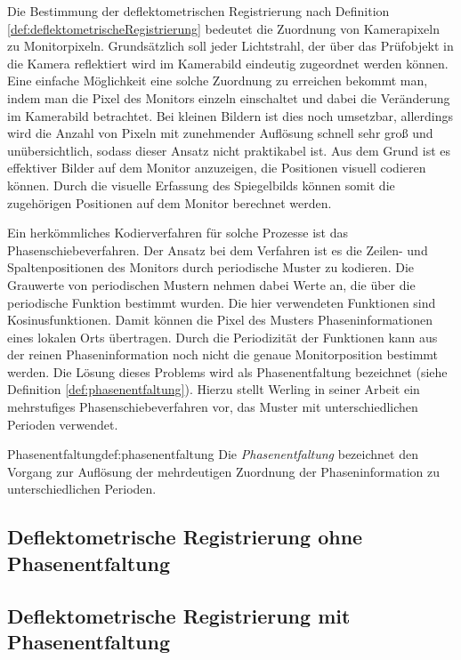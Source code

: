 Die Bestimmung der deflektometrischen Registrierung nach Definition \ref{def:deflektometrischeRegistrierung} bedeutet die Zuordnung von Kamerapixeln zu Monitorpixeln.
Grundsätzlich soll jeder Lichtstrahl, der über das Prüfobjekt in die Kamera reflektiert wird im Kamerabild eindeutig zugeordnet werden können.
Eine einfache Möglichkeit eine solche Zuordnung zu erreichen bekommt man, indem man die Pixel des Monitors einzeln einschaltet und dabei die Veränderung im Kamerabild betrachtet.
Bei kleinen Bildern ist dies noch umsetzbar, allerdings wird die Anzahl von Pixeln mit zunehmender Auflösung schnell sehr groß und unübersichtlich, sodass dieser Ansatz nicht praktikabel ist.
Aus dem Grund ist es effektiver Bilder auf dem Monitor anzuzeigen, die Positionen visuell codieren können.
Durch die visuelle Erfassung des Spiegelbilds können somit die zugehörigen Positionen auf dem Monitor berechnet werden.

\p
Ein herkömmliches Kodierverfahren für solche Prozesse ist das Phasenschiebeverfahren.
Der Ansatz bei dem Verfahren ist es die Zeilen- und Spaltenpositionen des Monitors durch periodische Muster zu kodieren.
Die Grauwerte von periodischen Mustern nehmen dabei Werte an, die über die periodische Funktion bestimmt wurden.
Die hier verwendeten Funktionen sind Kosinusfunktionen.
Damit können die Pixel des Musters Phaseninformationen eines lokalen Orts übertragen.
Durch die Periodizität der Funktionen kann aus der reinen Phaseninformation noch nicht die genaue Monitorposition bestimmt werden.
Die Lösung dieses Problems wird als Phasenentfaltung bezeichnet (siehe Definition \ref{def:phasenentfaltung}).
Hierzu stellt Werling in seiner Arbeit \cite{kit_werling} ein mehrstufiges Phasenschiebeverfahren vor, das Muster mit unterschiedlichen Perioden verwendet.

\begin{Definition}{Phasenentfaltung}{def:phasenentfaltung}
	Die \textit{Phasenentfaltung} bezeichnet den Vorgang zur Auflösung der mehrdeutigen Zuordnung der Phaseninformation zu unterschiedlichen Perioden.
\end{Definition}

{
	\FloatBarrier
    \subsection{Deflektometrische Registrierung ohne Phasenentfaltung}
    \label{sub:registrierungOhnePhasenentfaltung}
    
}

{
	\FloatBarrier
    \subsection{Deflektometrische Registrierung mit Phasenentfaltung}
    \label{sub:registrierungMitPhasenentfaltung}
    
}